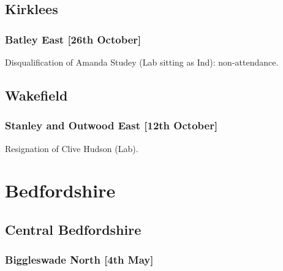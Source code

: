 \documentclass[a4paper,openany]{book}
\begin{document}
\begin{resultsiii}
\subsection*{Kirklees}

\subsubsection*{Batley East \hspace*{\fill}\nolinebreak[1]%
\enspace\hspace*{\fill}
[26th October]}


Disqualification of Amanda Studey (Lab sitting as Ind): non-attendance.

\subsection*{Wakefield}

\subsubsection*{Stanley and Outwood East \hspace*{\fill}\nolinebreak[1]%
\enspace\hspace*{\fill}
[12th October]}


Resignation of Clive Hudson (Lab).

\section{Bedfordshire}

\subsection*{Central Bedfordshire}

\subsubsection*{Biggleswade North \hspace*{\fill}\nolinebreak[1]%
\enspace\hspace*{\fill}
[4th May]}



\end{resultsiii}
\end{document}
